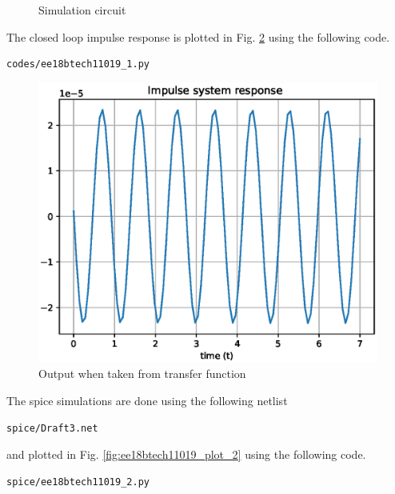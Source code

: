 \begin{enumerate}[label=\arabic*.,ref=\theenumi]
\renewcommand{\thefigure}{\theenumi.\arabic{figure}}
\begin{figure}[!ht]
	\begin{center}
		\resizebox{\columnwidth}{!}{}
	\end{center}
\caption{Simulation circuit}
\label{fig:ee18btech11019_fig4}
\end{figure}
\begin{table}[!ht]
\centering

\caption{}
\label{table:ee18btech11019_1}
\end{table}
\solution The closed loop impulse response is plotted in Fig.  \ref{fig:ee18btech11019_plot_1}
using the following code.
\begin{lstlisting}
codes/ee18btech11019_1.py
\end{lstlisting}
\begin{figure}[!ht]
\centering
\includegraphics[width=\columnwidth]{./figs/ee18btech11019_5.eps}
\caption{Output when taken from transfer function}
\label{fig:ee18btech11019_plot_1}
\end{figure}
%
The spice simulations are done using the following netlist
\begin{lstlisting}
spice/Draft3.net
\end{lstlisting}
%
and plotted in Fig. \ref{fig:ee18btech11019_plot_2}
%
using the following code.
\begin{lstlisting}
spice/ee18btech11019_2.py
\end{lstlisting}

\end{enumerate}
